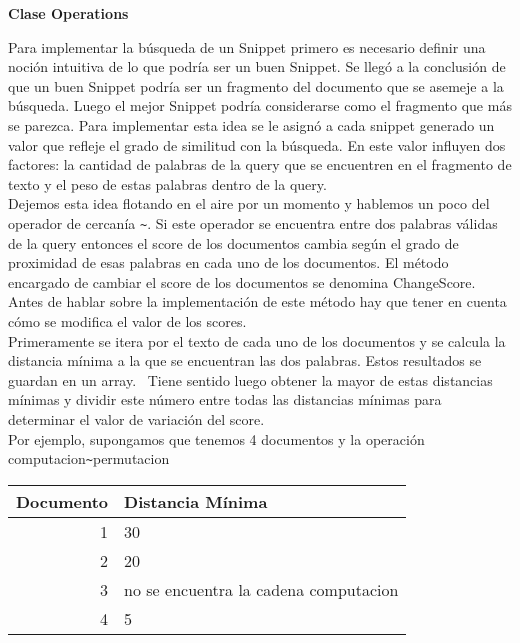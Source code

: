 \documentclass[12pt]{article}
\begin{document}
\newpage

 \textbf{ Clase Operations}

Para implementar la b\'usqueda de un Snippet primero es necesario definir una noci\'on intuitiva de lo que podr\'ia ser un buen Snippet.
Se lleg\'o a la conclusi\'on de que un buen Snippet podr\'ia ser un fragmento del documento que se asemeje a la b\'usqueda. Luego el mejor Snippet podr\'ia considerarse como el fragmento que m\'as se parezca. Para implementar esta idea se le asign\'o a cada snippet generado un valor que refleje el grado de similitud con la b\'usqueda. En este valor influyen dos factores: la cantidad de palabras de la query que se encuentren en el fragmento de texto y el peso de estas palabras dentro de la query.\\

Dejemos esta idea flotando en el aire por un momento y hablemos un poco del operador de cercan\'ia \verb|~|.
Si este operador se encuentra entre dos palabras v\'alidas de la query entonces el score de los documentos cambia según el grado de proximidad de esas palabras en cada uno de los documentos. El m\'etodo encargado de cambiar el score de los documentos se denomina ChangeScore.
Antes de hablar sobre la implementaci\'on de este m\'etodo hay que tener en cuenta c\'omo se modifica el valor de los scores.\\


Primeramente se itera por el texto de cada uno de los documentos y se calcula la distancia m\'inima a la que se encuentran las dos palabras. Estos resultados se guardan en un array. \
Tiene sentido luego obtener la mayor de estas distancias m\'inimas y dividir este n\'umero entre todas las distancias m\'inimas para determinar el valor de variaci\'on del score.\\

Por ejemplo, supongamos que tenemos 4 documentos y la operación computacion\verb|~|permutacion\\

\begin{tabular}{|r|l|}
\hline
 Documento  &   Distancia M\'inima \\
 \hline
1    &    30 \\
2    &    20 \\
3    &     no se encuentra la cadena computacion  \\
4    &    5  \\
\hline
\end{tabular} \\
\end{document}
